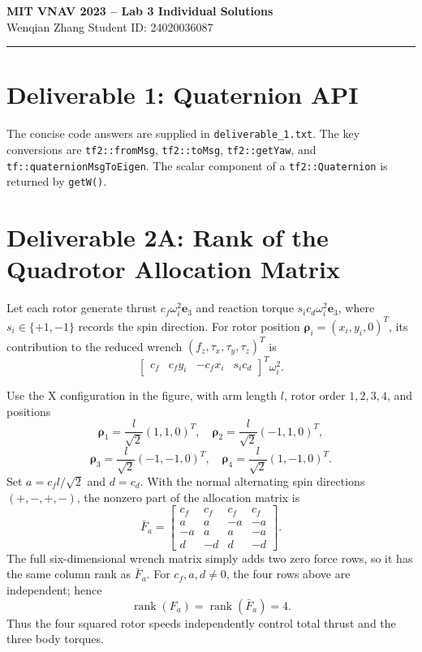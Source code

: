 \documentclass[11pt]{article}
\begin{document}
\begin{center}
{\LARGE\bfseries MIT VNAV 2023 -- Lab 3 Individual Solutions}\\[0.6em]
{\large Wenqian Zhang \quad Student ID: 24020036087}
\end{center}
\hrule

\section*{Deliverable 1: Quaternion API}
The concise code answers are supplied in \texttt{deliverable\_1.txt}. The key
conversions are \texttt{tf2::fromMsg}, \texttt{tf2::toMsg},
\texttt{tf2::getYaw}, and \texttt{tf::quaternionMsgToEigen}. The scalar
component of a \texttt{tf2::Quaternion} is returned by \texttt{getW()}.

\section*{Deliverable 2A: Rank of the Quadrotor Allocation Matrix}
Let each rotor generate thrust \(c_f\omega_i^2\bm e_3\) and reaction torque
\(s_i c_d\omega_i^2\bm e_3\), where \(s_i\in\{+1,-1\}\) records the spin
direction. For rotor position \(\bm\rho_i=(x_i,y_i,0)^T\), its contribution
to the reduced wrench \((f_z,\tau_x,\tau_y,\tau_z)^T\) is
\[
\begin{bmatrix}c_f&c_fy_i&-c_fx_i&s_ic_d\end{bmatrix}^T\omega_i^2.
\]

Use the X configuration in the figure, with arm length \(l\), rotor order
\(1,2,3,4\), and positions
\[
\bm\rho_1=\frac l{\sqrt2}(1,1,0)^T,\quad
\bm\rho_2=\frac l{\sqrt2}(-1,1,0)^T,
\]
\[
\bm\rho_3=\frac l{\sqrt2}(-1,-1,0)^T,\quad
\bm\rho_4=\frac l{\sqrt2}(1,-1,0)^T.
\]
Set \(a=c_fl/\sqrt2\) and \(d=c_d\). With the normal alternating spin
directions \((+,-,+,-)\), the nonzero part of the allocation matrix is
\[
\bar F_a=
\begin{bmatrix}
c_f&c_f&c_f&c_f\\
a&a&-a&-a\\
-a&a&a&-a\\
d&-d&d&-d
\end{bmatrix}.
\]
The full six-dimensional wrench matrix simply adds two zero force rows, so it
has the same column rank as \(\bar F_a\). For \(c_f,a,d\ne0\), the four rows
above are independent; hence
\[
\operatorname{rank}(F_a)=\operatorname{rank}(\bar F_a)=4.
\]
Thus the four squared rotor speeds independently control total thrust and the
three body torques.
\end{document}
